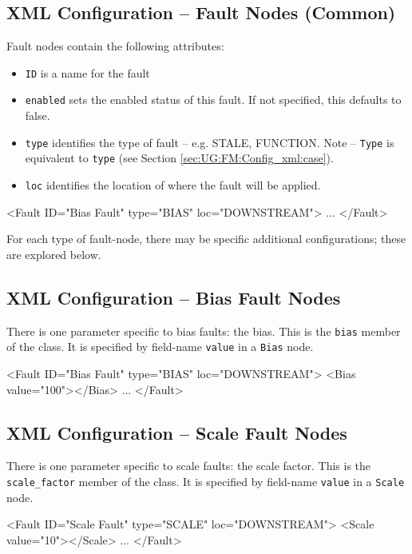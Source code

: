 \documentclass[11pt,fleqn]{report}
\begin{document}
\subsection {XML Configuration -- Fault Nodes (Common)}
\label{sec:UG:FM:XML_config_fault_node}
Fault nodes contain the following attributes:
\begin{itemize}
 \item \verb'ID' is a name for the fault
 \item \verb'enabled' sets the enabled status of this fault. If not specified,
   this defaults to false.
 \item \verb'type' identifies the type of fault -- e.g. STALE, FUNCTION.
   Note -- \verb'Type' is equivalent to \verb'type' (see Section
   \ref{sec:UG:FM:Config_xml:case}).
 \item \verb'loc' identifies the location of where the fault will be applied.
\end{itemize}
\begin{codeXML}
<Fault ID="Bias Fault" type="BIAS" loc="DOWNSTREAM">
  ...
</Fault>
\end{codeXML}

For each type of fault-node, there may be specific additional configurations;
these are explored below.

\subsection{XML Configuration -- Bias Fault Nodes}
\par There is one parameter specific to bias faults: the bias.
This is the \verb"bias" member of the class.
It is specified by field-name \verb'value' in a \verb'Bias' node.
\begin{codeXML}
<Fault ID="Bias Fault" type="BIAS" loc="DOWNSTREAM">
  <Bias value="100"></Bias>
  ...
</Fault>
\end{codeXML}

\subsection{XML Configuration -- Scale Fault Nodes}
\par There is one parameter specific to scale faults: the scale factor.
This is the \verb"scale_factor" member of the class.
It is specified by field-name \verb'value' in a \verb'Scale' node.
\begin{codeXML}
<Fault ID="Scale Fault" type="SCALE" loc="DOWNSTREAM">
  <Scale value="10"></Scale>
  ...
</Fault>
\end{codeXML}
\end{document}
